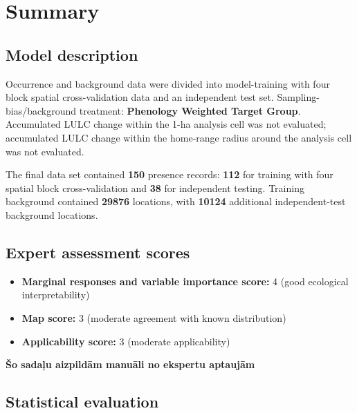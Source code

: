 \documentclass[
  openany]{book}
\providecommand{\tightlist}{%
  \setlength{\itemsep}{0pt}\setlength{\parskip}{0pt}}
\providecommand{\tightlist}{%
  \setlength{\itemsep}{0pt}%
  \setlength{\parskip}{0pt}%
}
\begin{document}
\section*{Summary}\label{summary-5}

\subsection*{Model description}\label{model-description-5}

Occurrence and background data were divided into model-training with four block spatial cross-validation data and an independent test set. Sampling-bias/background treatment: \textbf{Phenology Weighted Target Group}. Accumulated LULC change within the 1-ha analysis cell was not evaluated; accumulated LULC change within the home-range radius around the analysis cell was not evaluated.

The final data set contained \textbf{150} presence records: \textbf{112} for training with four spatial block cross-validation and \textbf{38} for independent testing. Training background contained \textbf{29876} locations, with \textbf{10124} additional independent-test background locations.

\subsection*{Expert assessment scores}\label{expert-assessment-scores-5}

\begin{itemize}
\tightlist
\item
  \textbf{Marginal responses and variable importance score:} 4 (good ecological interpretability)
\item
  \textbf{Map score:} 3 (moderate agreement with known distribution)
\item
  \textbf{Applicability score:} 3 (moderate applicability)
\end{itemize}

\textbf{Šo sadaļu aizpildām manuāli no ekspertu aptaujām}

\subsection*{Statistical evaluation}\label{statistical-evaluation-5}
\end{document}

